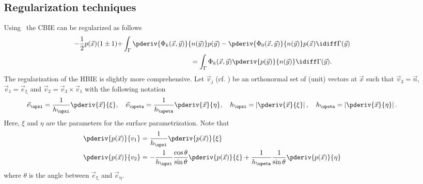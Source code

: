 \subsection{Regularization techniques}
Using~ the CBIE can be regularized as follows
\begin{equation}\label{Eq3:regulCBIE}
\begin{aligned}
	-\frac{1}{2}p(\vec{x})(1\pm 1) + &\int_\Gamma \pderiv{\Phi_k(\vec{x},\vec{y})}{n(\vec{y})}p(\vec{y}) - \pderiv{\Phi_0(\vec{x},\vec{y})}{n(\vec{y})} p(\vec{x}) \idiff\Gamma(\vec{y})\\
	&{\hskip10em\relax} = \int_\Gamma \Phi_k(\vec{x},\vec{y}) \pderiv{p(\vec{y})}{n(\vec{y})} \idiff\Gamma(\vec{y}).
\end{aligned}
\end{equation}
The regularization of the HBIE is slightly more comprehensive. Let $\vec{v}_j$ (cf. \cite[Fig. 2]{Simpson2014aib}) be an orthonormal set of (unit) vectors at $\vec{x}$ such that $\vec{v}
_3 = \vec{n}$, $\vec{v}_1=\vec{e}_\upxi$ and $\vec{v}_2 = \vec{v}_3\times\vec{v}_1$ with the following notation
\begin{equation*}
	\vec{e}_\upxi = \frac{1}{h_\upxi}\pderiv{\vec{x}}{\xi},\quad \vec{e}_\upeta = \frac{1}{h_\upeta}\pderiv{\vec{x}}{\eta},\quad  h_\upxi = \left|\pderiv{\vec{x}}{\xi}\right|,\quad h_\upeta = \left|\pderiv{\vec{x}}{\eta}\right|.
\end{equation*}
Here, $\xi$ and $\eta$ are the parameters for the surface parametrization. Note that~\cite[p. 219]{Scott2013ibe}
\begin{align*}
\pderiv{p(\vec{x})}{v_1} &= \frac{1}{h_\upxi}\pderiv{p(\vec{x})}{\xi}\\
\pderiv{p(\vec{x})}{v_2} &= -\frac{1}{h_\upxi}\frac{\cos\theta}{\sin\theta}\pderiv{p(\vec{x})}{\xi} + \frac{1}{h_\upeta}\frac{1}{\sin\theta}\pderiv{p(\vec{x})}{\eta}\\
\end{align*}
where $\theta$ is the angle between $\vec{e}_\upxi$ and $\vec{e}_\upeta$. 

